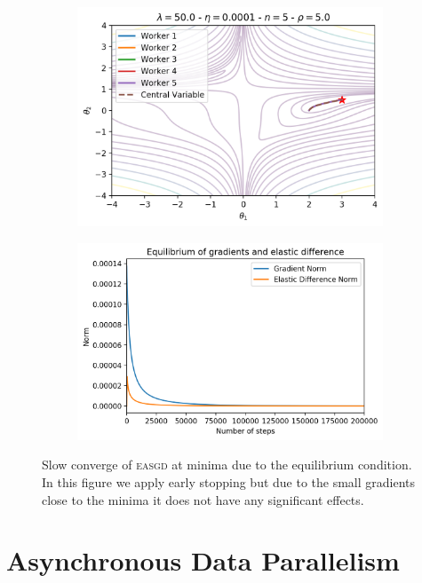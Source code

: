 \begin{figure}[H]
  \centering
  \begin{subfigure}{.45\textwidth}
    \centering
    \includegraphics[width=\linewidth]{resources/images/easgd_sync_slow_space}
  \end{subfigure}
  \begin{subfigure}{.45\textwidth}
    \centering
    \includegraphics[width=\linewidth]{resources/images/easgd_sync_slow_eq}
  \end{subfigure}
  \caption{Slow converge of \textsc{easgd} at minima due to the equilibrium condition. In this figure we apply early stopping but due to the small gradients close to the minima it does not have any significant effects.}
  \label{fig:easgd_sync_slow}
\end{figure}

\section{Asynchronous Data Parallelism}
\label{sec:asynchronous_data_parallelism}

